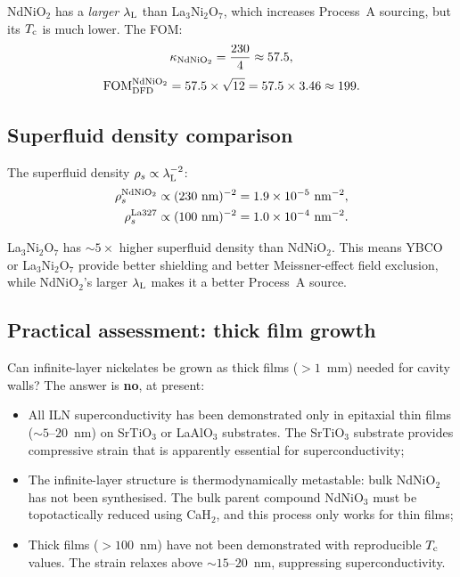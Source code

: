 \documentclass[11pt]{article}
\newcommand{\ee}[1]{\times 10^{#1}}
\newcommand{\lambdaL}{\lambda_{\rm L}}
\newcommand{\Tc}{T_{\rm c}}
\newcommand{\FOM}{\mathrm{FOM}}
\begin{document}
NdNiO$_2$ has a \emph{larger} $\lambdaL$ than La$_3$Ni$_2$O$_7$, which
increases Process~A sourcing, but its $\Tc$ is much lower. The FOM:
\begin{equation}
\kappa_{\rm NdNiO_2} = \frac{230}{4} \approx 57.5,
\end{equation}
\begin{equation}
\FOM_{\rm DFD}^{\rm NdNiO_2}
= 57.5 \times \sqrt{12}
= 57.5 \times 3.46
\approx 199.
\label{eq:fom-ndnio2}
\end{equation}

\subsection{Superfluid density comparison}

The superfluid density $\rho_s \propto \lambdaL^{-2}$:
\begin{align}
\rho_s^{\rm NdNiO_2} &\propto (230~\text{nm})^{-2} = 1.9\ee{-5}~\text{nm}^{-2}, \\
\rho_s^{\rm La327} &\propto (100~\text{nm})^{-2} = 1.0\ee{-4}~\text{nm}^{-2}.
\end{align}

La$_3$Ni$_2$O$_7$ has $\sim 5\times$ higher superfluid density than NdNiO$_2$.
This means YBCO or La$_3$Ni$_2$O$_7$ provide better shielding and better
Meissner-effect field exclusion, while NdNiO$_2$'s larger $\lambdaL$ makes
it a better Process~A source.

\subsection{Practical assessment: thick film growth}

Can infinite-layer nickelates be grown as thick films ($>1$~mm) needed for
cavity walls? The answer is \textbf{no}, at present:

\begin{itemize}
\item All ILN superconductivity has been demonstrated only in epitaxial thin
  films ($\sim 5$--$20$~nm) on SrTiO$_3$ or LaAlO$_3$ substrates. The
  SrTiO$_3$ substrate provides compressive strain that is apparently essential
  for superconductivity;
\item The infinite-layer structure is thermodynamically metastable: bulk
  NdNiO$_2$ has not been synthesised. The bulk parent compound NdNiO$_3$
  must be topotactically reduced using CaH$_2$, and this process only works
  for thin films;
\item Thick films ($> 100$~nm) have not been demonstrated with reproducible
  $\Tc$ values. The strain relaxes above $\sim 15$--$20$~nm, suppressing
  superconductivity.
\end{itemize}
\end{document}
